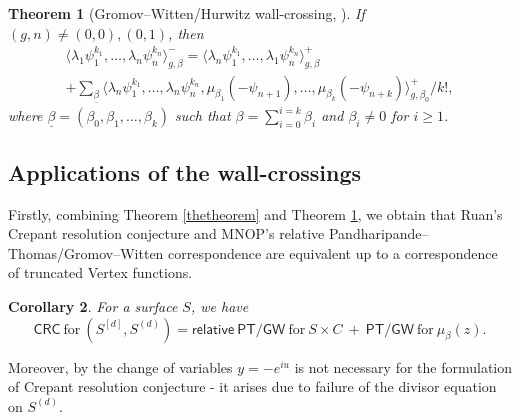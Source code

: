 \documentclass[11pt, reqno]{amsart}
\theoremstyle{plain}
\newtheorem{thm}{Theorem}[section]
\newtheorem{cor}[thm]{Corollary}
\theoremstyle{definition}
\theoremstyle{remark}
\begin{document}
\begin{thm}[Gromov--Witten/Hurwitz wall-crossing, \cite{N22}]\label{thetheorem2} If $(g,n)\neq (0,0) ,(0,1)$, then 
	\begin{multline*}
		\langle \lambda_1 \psi^{k_1}_1, \dots,\lambda_n \psi^{k_n}_n \rangle^{-}_{g,\beta} = \langle \lambda_n \psi^{k_1}_1, \dots,\lambda_1 \psi^{k_n}_n \rangle^{+}_{g,\beta} \\
		+\sum_{\underline{\beta}} \langle \lambda_n \psi^{k_1}_1, \dots,\lambda_n \psi^{k_n}_n, \mu_{\beta_1}(-\psi_{n+1}), \dots, \mu_{\beta_k}(-\psi_{n+k}) \rangle^{+}_{g,\beta_0}/k!,
	\end{multline*}
where $\underline{\beta}=(\beta_0, \beta_1, \dots, \beta_k)$ such that $\beta=\sum^{i=k}_{i=0}\beta_i$ and $\beta_i\neq 0$ for $i\geq 1$. 
\end{thm}

\subsection{Applications of the wall-crossings} \label{applications3} Firstly, combining Theorem \ref{thetheorem} and Theorem \ref{thetheorem2}, we obtain that Ruan's Crepant resolution conjecture \cite{Ru} and MNOP's relative Pandharipande--Thomas/Gromov--Witten correspondence \cite{MNOP,MNOP1} are equivalent up to a correspondence of truncated Vertex functions. 

\begin{cor} For a surface $S$, we have 
	\[ \mathsf{CRC} \ \mathrm{for} \ (S^{[d]}, S^{(d)})= \mathsf{relative \ PT/GW} \ \mathrm{for} \ S\times C \ + \ \mathsf{PT/GW}\  \mathrm{for} \ \mu_\beta(z).\]
	\end{cor}
Moreover, by \cite[Section 2.2]{BG} the change of variables $y=-e^{iu}$ is not necessary for the formulation of Crepant resolution conjecture - it arises due to failure of the divisor equation on $S^{(d)}$.
\end{document}
